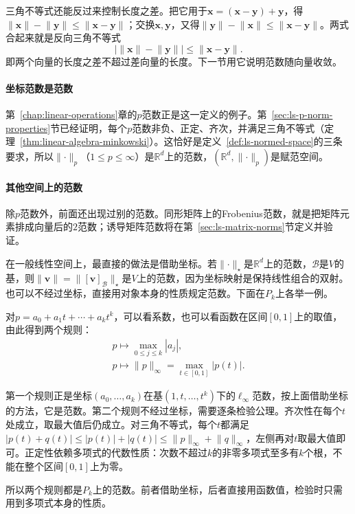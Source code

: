 三角不等式还能反过来控制长度之差。把它用于$\bm x=(\bm x-\bm y)+\bm y$，得$\lVert\bm x\rVert-\lVert\bm y\rVert\leq\lVert\bm x-\bm y\rVert$；交换$\bm x,\bm y$，又得$\lVert\bm y\rVert-\lVert\bm x\rVert\leq\lVert\bm x-\bm y\rVert$。两式合起来就是反向三角不等式
\begin{equation}
 \bigl|\lVert\bm x\rVert-\lVert\bm y\rVert\bigr|\leq\lVert\bm x-\bm y\rVert.
 \label{eq:ls-reverse-triangle}
\end{equation}
即两个向量的长度之差不超过差向量的长度。下一节用它说明范数随向量收敛。

\paragraph{坐标范数是范数}
\label{sec:ls-norms-distances}
\label{sec:linear-algebra-distance-relations}
第~\ref{chap:linear-operations}章的$p$范数正是这一定义的例子。第~\ref{sec:ls-p-norm-properties}节已经证明，每个$p$范数非负、正定、齐次，并满足三角不等式（定理~\ref{thm:linear-algebra-minkowski}）。这恰好是定义~\ref{def:ls-normed-space}的三条要求，所以$\lVert\cdot\rVert_p$（$1\leq p\leq\infty$）是$\mathbb R^d$上的范数，$(\mathbb R^d,\lVert\cdot\rVert_p)$是赋范空间。

\paragraph{其他空间上的范数}
除$p$范数外，前面还出现过别的范数。同形矩阵上的Frobenius范数，就是把矩阵元素排成向量后的$2$范数；诱导矩阵范数将在第~\ref{sec:ls-matrix-norms}节定义并验证。

在一般线性空间上，最直接的做法是借助坐标。若$\lVert\cdot\rVert_\star$是$\mathbb R^d$上的范数，$\mathcal B$是$V$的基，则$\lVert\bm v\rVert=\lVert[\bm v]_{\mathcal B}\rVert_\star$是$V$上的范数，因为坐标映射是保持线性组合的双射。也可以不经过坐标，直接用对象本身的性质规定范数。下面在$P_k$上各举一例。
\begin{example}[多项式空间上的两个范数]
\label{ex:ls-polynomial-norms}
对$p=a_0+a_1t+\cdots+a_kt^k$，可以看系数，也可以看函数在区间$[0,1]$上的取值，由此得到两个规则：
\[
\begin{gathered}
p\mapsto\max_{0\leq j\leq k}|a_j|,\\
p\mapsto\lVert p\rVert_\infty=\max_{t\in[0,1]}|p(t)| .
\end{gathered}
\]

第一个规则正是坐标$(a_0,\ldots,a_k)$在基$(1,t,\ldots,t^k)$下的$\ell_\infty$范数，按上面借助坐标的方法，它是范数。第二个规则不经过坐标，需要逐条检验公理。齐次性在每个$t$处成立，取最大值后仍成立。对三角不等式，每个$t$都满足$|p(t)+q(t)|\leq|p(t)|+|q(t)|\leq\lVert p\rVert_\infty+\lVert q\rVert_\infty$，左侧再对$t$取最大值即可。正定性依赖多项式的代数性质：次数不超过$k$的非零多项式至多有$k$个根，不能在整个区间$[0,1]$上为零。

所以两个规则都是$P_k$上的范数。前者借助坐标，后者直接用函数值，检验时只需用到多项式本身的性质。
\end{example}

